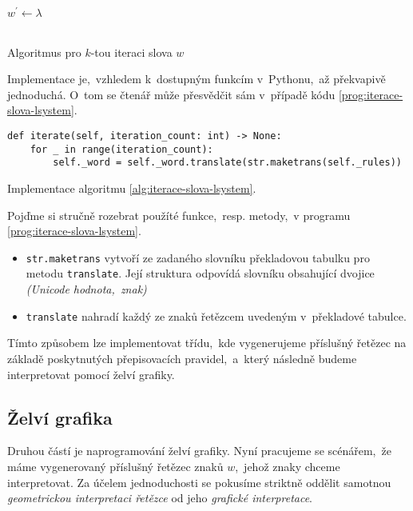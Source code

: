 \begin{algorithm}[h]
    $w^\prime\gets\lambda$\\
    \\
    \caption{Algoritmus pro $k$-tou iteraci slova $w$}
    \label{alg:iterace-slova-lsystem}
\end{algorithm}
Implementace je,~vzhledem k~dostupným funkcím v~Pythonu,~až překvapivě jednoduchá. O~tom se čtenář může přesvědčit sám v~případě kódu \ref{prog:iterace-slova-lsystem}.
\begin{program}[h]
\begin{lstlisting}[style=python]
def iterate(self, iteration_count: int) -> None:
    for _ in range(iteration_count):
        self._word = self._word.translate(str.maketrans(self._rules))
\end{lstlisting}
    \caption{Implementace algoritmu \ref{alg:iterace-slova-lsystem}.}
    \label{prog:iterace-slova-lsystem}
\end{program}
Pojďme si stručně rozebrat použíté funkce,~resp. metody,~v programu \ref{prog:iterace-slova-lsystem}.
\begin{itemize}
    \item \texttt{str.maketrans} vytvoří ze zadaného slovníku překladovou tabulku pro metodu \texttt{translate}. Její struktura odpovídá slovníku obsahující dvojice \emph{(Unicode hodnota,~znak)}
    \item \texttt{translate} nahradí každý ze znaků řetězcem uvedeným v~překladové tabulce.
\end{itemize}
Tímto způsobem lze implementovat třídu,~kde vygenerujeme příslušný řetězec na základě poskytnutých přepisovacích pravidel,~a~který následně budeme interpretovat pomocí želví grafiky.

\subsection{Želví grafika}\label{subsec:implementace-zelvi-grafiky}

Druhou částí je naprogramování želví grafiky. Nyní pracujeme se scénářem,~že máme vygenerovaný příslušný řetězec znaků $w$,~jehož znaky chceme interpretovat. Za účelem jednoduchosti se pokusíme striktně oddělit samotnou \emph{geometrickou interpretaci řetězce} od jeho \emph{grafické interpretace}.

